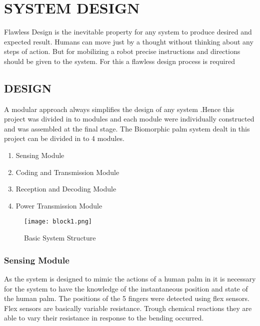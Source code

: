 \documentclass[a4paper, 12pt, notitlepage]{report}
\begin{document}
\chapter{SYSTEM DESIGN}

Flawless Design is the inevitable property for any system to produce desired and expected result. Humans can move just by a thought without thinking about any steps of action. But for mobilizing a robot precise instructions and directions should be given to the system. For this a flawless design process is required\\

\section{DESIGN}

A modular approach always simplifies the design of any system .Hence this project was divided in to modules and each module were individually constructed and was assembled at the final stage. The Biomorphic palm system dealt in this project can be divided in to 4 modules.\\

\begin{enumerate}
\item Sensing Module
\item Coding and Transmission Module
\item Reception and Decoding Module
\item Power Transmission Module 

\end{enumerate}

\newpage
\begin{figure}
{\texttt{[image: block1.png]}}
\caption{Basic System Structure}
\end{figure}

\subsection{Sensing Module}

As the system is designed to mimic the actions of a human palm in it is necessary for the system to have the knowledge of the instantaneous position and state of the human palm. The positions of the 5 fingers were detected using flex sensors. Flex sensors are basically variable resistance. Trough chemical reactions they are able to vary their resistance in response to the bending occurred. \\
\end{document}
